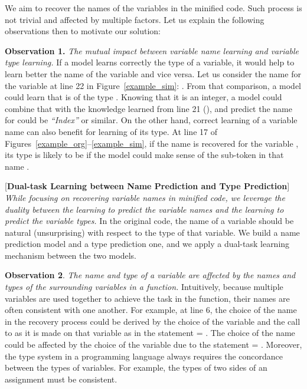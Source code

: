 We aim to recover the names of the variables in the minified
code. Such process is not trivial and affected by multiple factors.
Let us explain the following observations then to motivate our
solution:

\vspace{2pt} \textbf{Observation 1.} {\em The mutual impact between
  variable name learning and variable type learning.} If a model
learns correctly the type of a variable, it would help to learn better
the name of the variable and vice versa. Let us consider the name
 for the variable  at line 22 in
Figure~\ref{example_sim}: . From that comparison, a
model could learn that  is of the type . Knowing
that it is an integer, a model could combine that with the knowledge
learned from line 21 (), and predict the
name for  could be {\em ``Index''} or similar. On the other
hand, correct learning of a variable name can also benefit for
learning of its type. At line 17 of
Figures~\ref{example_org}--\ref{example_sim}, if the name
 is recovered for the variable ,
its type is likely to be  if the model could make sense of
the sub-token  in that name .

\vspace{2pt}  [{\bf Dual-task Learning
    between Name Prediction and Type Prediction}] {\em While focusing
  on recovering variable names in minified code, we leverage the
  duality between the learning to predict the variable names and the
  learning to predict the variable types.} In the original code, the
name of a variable should be natural (unsurprising) with respect to
the type of that variable. We build a name prediction model and a type
prediction one, and we apply a dual-task learning mechanism between
the two models.

\vspace{2pt}
\textbf{Observation 2}. {\em The name and type of a variable are
  affected by the names and types of the surrounding variables in a
  function.}  Intuitively, because multiple variables are used
together to achieve the task in the function, their names are
often consistent with one another. For example, at line 6, the choice
of the name  in the recovery process could be derived
by the choice of the variable  and the call to
 as it is made on that variable as in the statement
 = . The choice of the name
 could be affected by the choice of the
variable  due to the statement  =
. Moreover, the type system in a programming
language always requires the concordance between the types of
variables. For example, the types of two sides of an assignment must
be consistent.

